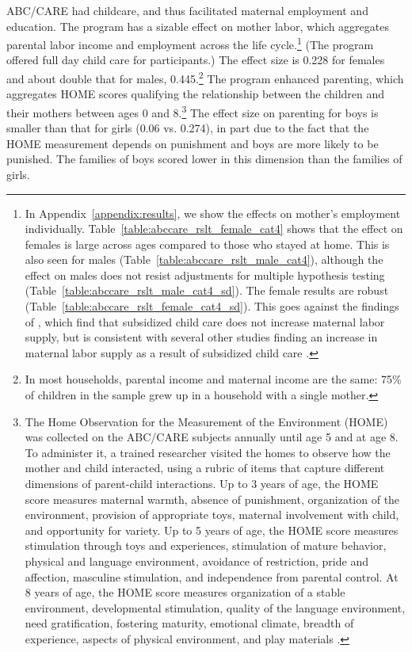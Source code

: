 ABC/CARE had childcare, and thus facilitated maternal employment and education. The program has a sizable effect on mother labor, which aggregates parental labor income and employment across the life cycle.\footnote{In Appendix~\ref{appendix:results}, we show the effects on mother's employment individually. Table~\ref{table:abccare_rslt_female_cat4} shows that the effect on females is large across ages compared to those who stayed at home. This is also seen for males (Table~\ref{table:abccare_rslt_male_cat4}), although the effect on males does not resist adjustments for multiple hypothesis testing (Table~\ref{table:abccare_rslt_male_cat4_sd}). The female results are robust (Table~\ref{table:abccare_rslt_female_cat4_sd}). This goes against the findings of \citet{Havnes_Mogstad_2011_JPE}, which find that subsidized child care does not increase maternal labor supply, but is consistent with several other studies finding an increase in maternal labor supply as a result of subsidized child care \citep{Bauernschuster_Schlotter_2015_JPE,Bettendorf_etal_2015_LE,Geyer_etal_2015_LE,Brilli_etal_2016_REH}.} (The program offered full day child care for participants.) The effect size is 0.228 for females and about double that for males, 0.445.\footnote{In most households, parental income and maternal income are the same: 75\% of children in the sample grew up in a household with a single mother.} The program enhanced parenting, which aggregates HOME scores qualifying the relationship between the children and their mothers between ages 0 and 8.\footnote{The Home Observation for the Measurement of the Environment (HOME) was collected on the ABC/CARE subjects annually until age 5 and at age 8. To administer it, a trained researcher visited the homes to observe how the mother and child interacted, using a rubric of items that capture different dimensions of parent-child interactions. Up to 3 years of age, the HOME score measures maternal warmth, absence of punishment, organization of the environment, provision of appropriate toys, maternal involvement with child, and opportunity for variety. Up to 5 years of age, the HOME score measures stimulation through toys and experiences, stimulation of mature behavior, physical and language environment, avoidance of restriction, pride and affection, masculine stimulation, and independence from parental control. At 8 years of age, the HOME score measures organization of a stable environment, developmental stimulation, quality of the language environment, need gratification, fostering maturity, emotional climate, breadth of experience, aspects of physical environment, and play materials \citep{Bradley-Caldwell_1977_AJMD}.} The effect size on parenting for boys is smaller than that for girls (0.06 vs. 0.274), in part due to the fact that the HOME measurement depends on punishment and boys are more likely to be punished. The families of boys scored lower in this dimension than the families of girls.

